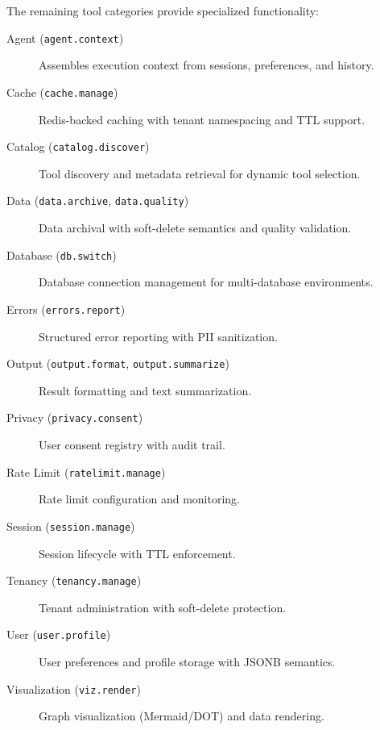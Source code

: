 The remaining tool categories provide specialized functionality:

\begin{description}
    \item[Agent (\texttt{agent.context})] Assembles execution context from sessions, preferences, and history.
    
    \item[Cache (\texttt{cache.manage})] Redis-backed caching with tenant namespacing and TTL support.
    
    \item[Catalog (\texttt{catalog.discover})] Tool discovery and metadata retrieval for dynamic tool selection.
    
    \item[Data (\texttt{data.archive}, \texttt{data.quality})] Data archival with soft-delete semantics and quality validation.
    
    \item[Database (\texttt{db.switch})] Database connection management for multi-database environments.
    
    \item[Errors (\texttt{errors.report})] Structured error reporting with PII sanitization.
    
    \item[Output (\texttt{output.format}, \texttt{output.summarize})] Result formatting and text summarization.
    
    \item[Privacy (\texttt{privacy.consent})] User consent registry with audit trail.
    
    \item[Rate Limit (\texttt{ratelimit.manage})] Rate limit configuration and monitoring.
    
    \item[Session (\texttt{session.manage})] Session lifecycle with TTL enforcement.
    
    \item[Tenancy (\texttt{tenancy.manage})] Tenant administration with soft-delete protection.
    
    \item[User (\texttt{user.profile})] User preferences and profile storage with JSONB semantics.
    
    \item[Visualization (\texttt{viz.render})] Graph visualization (Mermaid/DOT) and data rendering.
\end{description}

